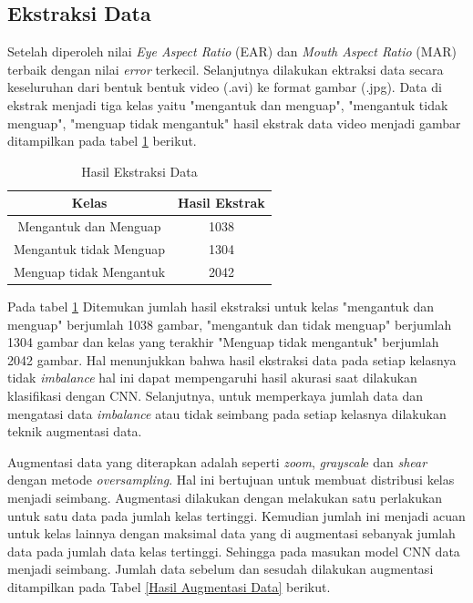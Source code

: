 \subsection{Ekstraksi Data}

     Setelah diperoleh nilai \textit{Eye Aspect Ratio }(EAR) dan \textit{Mouth Aspect Ratio} (MAR) terbaik dengan nilai \textit{error} terkecil. Selanjutnya dilakukan ektraksi data secara keseluruhan dari bentuk bentuk video (.avi) ke format gambar (.jpg). Data di ekstrak menjadi tiga kelas yaitu "mengantuk dan menguap", "mengantuk tidak menguap", "menguap tidak mengantuk" hasil ekstrak data video menjadi gambar ditampilkan pada tabel \ref{Hasil Ekstraksi Data} berikut. 

       \begin{table}[H]
            \centering
            \caption{Hasil Ekstraksi Data}
            \begin{tabular}{cc}
                \toprule
                \textbf{Kelas} & \textbf{Hasil Ekstrak} \\
                \midrule  
                           Mengantuk dan Menguap & 1038  \\
                          Mengantuk tidak Menguap & 1304 \\
                           Menguap tidak Mengantuk& 2042  \\
                
                    \bottomrule
                \end{tabular}
                \label{Hasil Ekstraksi Data}
            \end{table}

        Pada tabel \ref{Hasil Ekstraksi Data} Ditemukan jumlah hasil ekstraksi untuk kelas "mengantuk dan menguap" berjumlah 1038 gambar, "mengantuk dan tidak menguap" berjumlah 1304 gambar dan kelas yang terakhir "Menguap tidak mengantuk" berjumlah 2042 gambar. Hal menunjukkan bahwa hasil ekstraksi data pada setiap kelasnya tidak \textit{imbalance} hal ini dapat mempengaruhi hasil akurasi saat dilakukan klasifikasi dengan CNN. Selanjutnya, untuk memperkaya jumlah data dan mengatasi data \textit{imbalance} atau tidak seimbang pada setiap kelasnya dilakukan teknik augmentasi data. 
        
        Augmentasi data yang diterapkan adalah seperti \textit{zoom}, \textit{grayscal}e dan \textit{shear} dengan metode \textit{oversampling}. Hal ini bertujuan untuk membuat distribusi kelas menjadi seimbang. Augmentasi dilakukan dengan melakukan satu perlakukan untuk satu data pada jumlah kelas tertinggi. Kemudian jumlah ini menjadi acuan untuk kelas lainnya dengan maksimal data yang di augmentasi sebanyak jumlah data pada jumlah data kelas tertinggi. Sehingga pada masukan model CNN data menjadi seimbang. Jumlah data sebelum dan sesudah dilakukan augmentasi ditampilkan pada Tabel \ref{Hasil Augmentasi Data} berikut.
    


